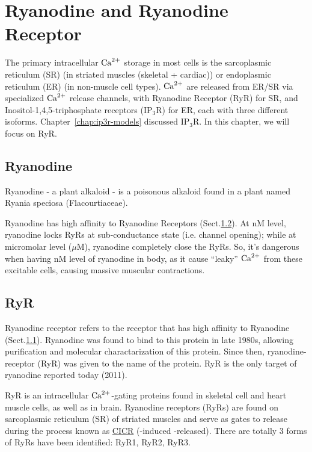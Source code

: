 
\chapter{Ryanodine and Ryanodine Receptor}
\label{chap:ryan-ryan-recept}

The primary intracellular ${\text{Ca}^{2+}}$ storage in most cells is the sarcoplasmic
reticulum (SR) (in striated muscles (skeletal + cardiac)) or endoplasmic
reticulum (ER) (in non-muscle cell types). ${\text{Ca}^{2+}}$ are released from ER/SR via
specialized ${\text{Ca}^{2+}}$ release channels, with Ryanodine Receptor (RyR) for SR, and
Inositol-1,4,5-triphosphate receptors (IP$_3$R) for ER, each with three
different isoforms.
Chapter~\ref{chap:ip3r-models} discussed IP$_3$R. In this chapter, we will focus
on RyR.

\section{Ryanodine}
\label{sec:ryanodine}

Ryanodine - a plant alkaloid - is a poisonous alkaloid found in a plant named
Ryania speciosa (Flacourtiaceae). 

Ryanodine has high affinity to Ryanodine Receptors (Sect.\ref{sec:ryr}).
At nM level, ryanodine locks RyRs at sub-conductance state (i.e. channel
opening); while at micromolar level ($\mu$M), ryanodine completely close the
RyRs. So, it's dangerous when having nM level of ryanodine in body, as it cause
``leaky'' ${\text{Ca}^{2+}}$ from these excitable cells, causing massive muscular
contractions.



\section{RyR}
\label{sec:ryr}
\label{sec:introduction_ryr}
\label{sec:RyR}

Ryanodine receptor refers to the receptor that has high affinity to Ryanodine
(Sect.\ref{sec:ryanodine}). Ryanodine was found to bind to this protein in late
1980s, allowing purification and molecular charactarization of this protein.
Since then, ryanodine-receptor (RyR) was given to the name of the protein. RyR
is the only target of ryanodine reported today (2011).

RyR is an intracellular ${\text{Ca}^{2+}}$-gating proteins found in skeletal cell and heart
muscle cells, as well as in brain. Ryanodine receptors (RyRs) are found on
sarcoplasmic reticulum (SR) of striated muscles and serve as gates to release
 during the process known as \hyperref[sec:cicr]{CICR}
(-induced -released). There are totally 3 forms of RyRs have
been identified: RyR1, RyR2, RyR3\citep{rosemblit1999icr}.

